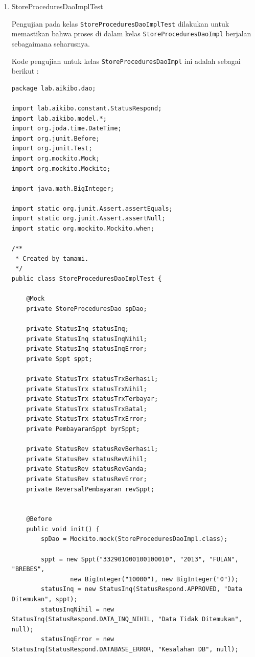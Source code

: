 \documentclass[pdftex,12pt, oneside]{article}
\begin{document}
\begin{enumerate}[A.]
\begin{enumerate}[1.]
    \item StoreProceduresDaoImplTest
    
    Pengujian pada kelas \texttt{StoreProceduresDaoImplTest} dilakukan untuk memastikan bahwa proses di dalam kelas \texttt{StoreProceduresDaoImpl} berjalan sebagaimana seharusnya.
    
    Kode pengujian untuk kelas \texttt{StoreProceduresDaoImpl} ini adalah sebagai berikut :
    
    \begin{lstlisting}
package lab.aikibo.dao;

import lab.aikibo.constant.StatusRespond;
import lab.aikibo.model.*;
import org.joda.time.DateTime;
import org.junit.Before;
import org.junit.Test;
import org.mockito.Mock;
import org.mockito.Mockito;

import java.math.BigInteger;

import static org.junit.Assert.assertEquals;
import static org.junit.Assert.assertNull;
import static org.mockito.Mockito.when;

/**
 * Created by tamami.
 */
public class StoreProceduresDaoImplTest {

    @Mock
    private StoreProceduresDao spDao;

    private StatusInq statusInq;
    private StatusInq statusInqNihil;
    private StatusInq statusInqError;
    private Sppt sppt;

    private StatusTrx statusTrxBerhasil;
    private StatusTrx statusTrxNihil;
    private StatusTrx statusTrxTerbayar;
    private StatusTrx statusTrxBatal;
    private StatusTrx statusTrxError;
    private PembayaranSppt byrSppt;

    private StatusRev statusRevBerhasil;
    private StatusRev statusRevNihil;
    private StatusRev statusRevGanda;
    private StatusRev statusRevError;
    private ReversalPembayaran revSppt;


    @Before
    public void init() {
        spDao = Mockito.mock(StoreProceduresDaoImpl.class);

        sppt = new Sppt("332901000100100010", "2013", "FULAN", "BREBES",
                new BigInteger("10000"), new BigInteger("0"));
        statusInq = new StatusInq(StatusRespond.APPROVED, "Data Ditemukan", sppt);
        statusInqNihil = new StatusInq(StatusRespond.DATA_INQ_NIHIL, "Data Tidak Ditemukan", null);
        statusInqError = new StatusInq(StatusRespond.DATABASE_ERROR, "Kesalahan DB", null);


\end{lstlisting}
\end{enumerate}
\end{enumerate}
\end{document}

